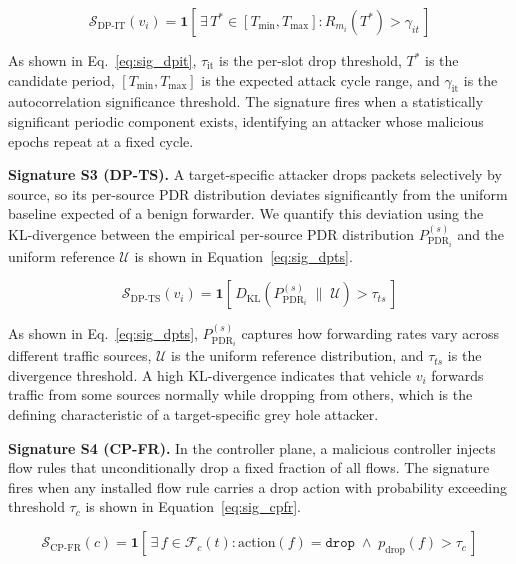 \documentclass[12pt, a4paper]{report}
\begin{document}
\begin{equation}
\label{eq:sig_dpit}
\mathcal{S}_{\text{DP-IT}}(v_i) =
\mathbf{1}\!\left[\,
\exists\,T^* \in [T_{\min}, T_{\max}] : R_{m_i}(T^*) > \gamma_{it}
\,\right]
\end{equation}

As shown in Eq.~\eqref{eq:sig_dpit}, $\tau_{\text{it}}$ is the 
per-slot drop threshold, $T^*$ is the candidate period, 
$[T_{\min}, T_{\max}]$ is the expected attack cycle range, and 
$\gamma_{\text{it}}$ is the autocorrelation significance threshold. 
The signature fires when a statistically significant periodic 
component exists, identifying an attacker whose malicious epochs 
repeat at a fixed cycle.

\textbf{Signature S3 (DP-TS).} A target-specific attacker drops packets
selectively by source, so its per-source PDR distribution deviates
significantly from the uniform baseline expected of a benign forwarder.
We quantify this deviation using the KL-divergence between the empirical
per-source PDR distribution $P_{\text{PDR}_i}^{(s)}$ and the uniform
reference $\mathcal{U}$ is shown in Equation~\eqref{eq:sig_dpts}.

\begin{equation}
\label{eq:sig_dpts}
\mathcal{S}_{\text{DP-TS}}(v_i) =
\mathbf{1}\!\left[\,
D_{\mathrm{KL}}\!\left(P_{\text{PDR}_i}^{(s)} \;\|\; \mathcal{U}\right)
> \tau_{ts}
\,\right]
\end{equation}

As shown in Eq.~\eqref{eq:sig_dpts}, $P_{\text{PDR}_i}^{(s)}$ 
captures how forwarding rates vary across different traffic sources, 
$\mathcal{U}$ is the uniform reference distribution, and $\tau_{ts}$ 
is the divergence threshold. A high KL-divergence indicates that 
vehicle $v_i$ forwards traffic from some sources normally while 
dropping from others, which is the defining characteristic of a 
target-specific grey hole attacker.

\textbf{Signature S4 (CP-FR).} In the controller plane, a malicious controller
injects flow rules that unconditionally drop a fixed fraction of all flows.
The signature fires when any installed flow rule carries a drop action with
probability exceeding threshold $\tau_c$ is shown in Equation~\eqref{eq:sig_cpfr}.

\begin{equation}
\label{eq:sig_cpfr}
\mathcal{S}_{\text{CP-FR}}(c) =
\mathbf{1}\!\left[\,
\exists\,f \in \mathcal{F}_c(t) :
\mathrm{action}(f) = \texttt{drop} \;\wedge\;
p_{\text{drop}}(f) > \tau_c
\,\right]
\end{equation}
\end{document}

